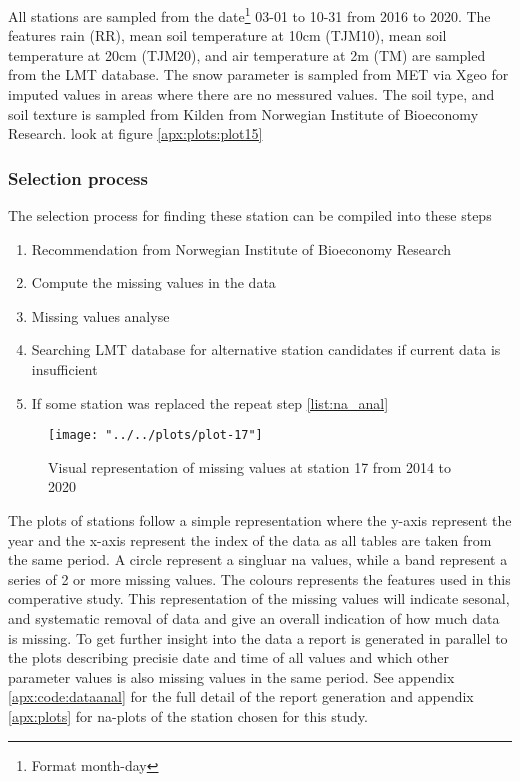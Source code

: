 All stations are sampled from the date\footnote{Format month-day} 03-01 to 10-31 from 2016 to 2020. The features rain (RR), mean soil temperature at 10cm (TJM10), mean soil temperature at 20cm (TJM20), and air temperature at 2m (TM) are sampled from the LMT database. The snow parameter is sampled from MET via Xgeo for imputed values in areas where there are no messured values. The soil type, and soil texture is sampled from Kilden from Norwegian Institute of Bioeconomy Research. look at figure \ref{apx:plots:plot15}

\subsubsection{Selection process}
The selection process for finding these station can be compiled into these steps

\begin{enumerate}
	\item Recommendation from Norwegian Institute of Bioeconomy Research
	\item \label{list:na_anal}Compute the missing values in the data
	\item Missing values analyse 
	\item Searching LMT database for alternative station candidates if current data is insufficient
	\item If some station was replaced the repeat step \ref{list:na_anal}
\end{enumerate}

\begin{figure}
	\label{fig:plot-17}
	\texttt{[image: "../../plots/plot-17"]}
	\caption{Visual representation of missing values at station 17 from 2014 to 2020}
\end{figure}

The plots of stations follow a simple representation where the y-axis represent the year and the x-axis represent the index of the data as all tables are taken from the same period. A circle represent a singluar na values, while a band represent a series of 2 or more missing values. The colours represents the features used in this comperative study. This representation of the missing values will indicate sesonal, and systematic removal of data and give an overall indication of how much data is missing. To get further insight into the data a report is generated in parallel to the plots describing precisie date and time of all values and which other parameter values is also missing values in the same period. See appendix \ref{apx:code:dataanal} for the full detail of the report generation and appendix \ref{apx:plots} for na-plots of the station chosen for this study.

